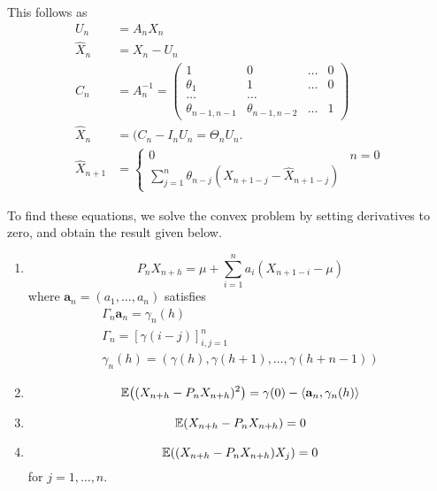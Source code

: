 This follows as
\begin{align}
  \label{eq:78}
  U_{n} &= A_{n} X_{n} \\
  \hat X_{n} &= X_{n} - U_{n} \\
  C_{n} &= A_{n}^{-1} =
  \begin{pmatrix}
    1 &0 &\dots &0 \\
    \theta_{1} &1 &\dots &0 \\
    \dots &\dots & & \\
    \theta_{n-1, n-1} &\theta_{n-1, n-2} &\dots &1
  \end{pmatrix} \\
  \hat X_{n} &= (C_{n} - I_{n} U_{n} = \Theta_{n} U_{n}. \\
  \hat X_{n+1} &=
  \begin{cases}
    0 & n = 0 \\
    \sum_{j=1}^{n} \theta_{n-j} (X_{n+1-j} - \hat X_{n+1-j}) 
  \end{cases}
\end{align}

To find these equations, we solve the convex problem by setting
derivatives to zero, and obtain the result given below.

\begin{thm}
  \label{defn:stationary_processes:1}
  \begin{enumerate}
  \item
    \begin{equation}
      P_{n}X_{n+h} = \mu + \sum_{i=1}^{n} a_{i} (X_{n+1-i} - \mu)
    \end{equation} where $\mathbf{a}_{n} = (a_{1}, \dots, a_{n})$ satisfies
    \begin{align}
      \Gamma_{n} \mathbf{a}_{n} = \gamma_{n}(h) \\
      \Gamma_{n} = [\gamma(i - j)]^{n}_{i,j = 1} \\
      \gamma_{n}(h) = (\gamma(h), \gamma(h+1), \dots, \gamma(h + n - 1))
    \end{align}
  \item
    \begin{equation}
      \E{(X_{n+h} - P_{n} X_{n+h})^{2}} = \gamma(0) -
      \IP{\mathbf{a}_{n}, \gamma_{n}(h)}
    \end{equation}
  \item
    \begin{equation}
      \E{X_{n+h} - P_{n} X_{n+h}} = 0
    \end{equation}
  \item
    \begin{equation}
      \E{(X_{n+h} - P_{n} X_{n+h}) X_{j}} = 0
    \end{equation} for $j = 1, \dots, n$.
  \end{enumerate}
\end{thm}

